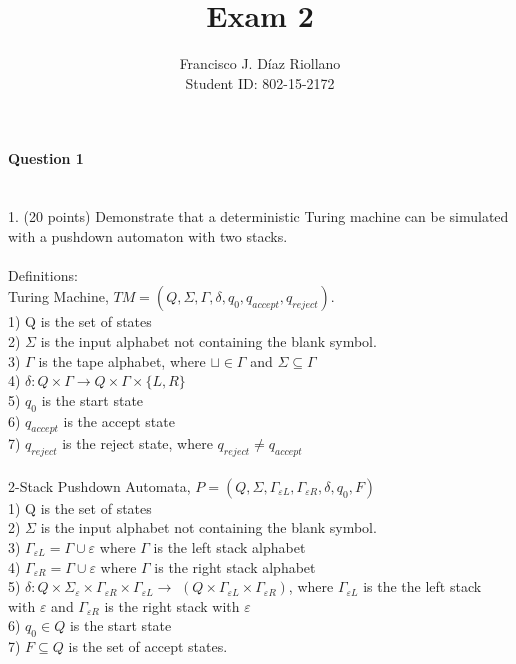\documentclass{report}
\title{Exam 2}
\author{Francisco J. Díaz Riollano \\ Student ID: 802-15-2172 }
\newcommand{\me}[1]{
\begin{math}
#1
\end{math}
}
\begin{document}
\maketitle
\paragraph{\Large{Question 1\\ \\}}
1. (20 points) Demonstrate that a deterministic Turing machine can be simulated with a pushdown automaton with two stacks.  \\ \\
Definitions: \\
Turing Machine, \me{TM =(Q,\Sigma, \Gamma, \delta, q_0,q_{accept}, q_{reject}). } \\
1) Q is the set of states \\
2)\me{\Sigma} is the input alphabet not containing the blank symbol. \\
3) \me{\Gamma} is the tape alphabet, where $\sqcup \in \Gamma $ and $\Sigma \subseteq \Gamma$ \\
4) \me{\delta: Q \times \Gamma \to Q \times \Gamma \times  \{L,R\}}\\
5) $q_0$ is the start state\\
6) $q_{accept}$ is the accept state \\
7) $q_{reject}$ is the reject state, where $q_{reject} \neq q_{accept}$
\\ \\
2-Stack Pushdown Automata, \me{P =(Q,\Sigma, \Gamma_{\varepsilon L},\Gamma_{\varepsilon R}, \delta, q_0,F)} \\
1) Q is the set of states \\
2)\me{\Sigma} is the input alphabet not containing the blank symbol. \\
3) \me{\Gamma_{\varepsilon L} = \Gamma \cup \varepsilon} where $\Gamma$ is the left stack alphabet \\
4) \me{\Gamma_{\varepsilon R} = \Gamma \cup \varepsilon} where $\Gamma$ is the right stack alphabet \\
5) \me{\delta: Q \times \Sigma_{\varepsilon} \times \Gamma_{\varepsilon R} \times \Gamma_{\varepsilon L}  \to } $(Q \times \Gamma_{\varepsilon L}\times\Gamma_{\varepsilon R})$, where $\Gamma_{\varepsilon L} $ is the the left stack with    $\varepsilon$ and $\Gamma_{\varepsilon R}$ is the right stack with $\varepsilon$ \\
6) $q_0 \in Q$ is the start state\\
7) $F \subseteq Q$ is the set of accept states. \\ \\ 
\end{document}
